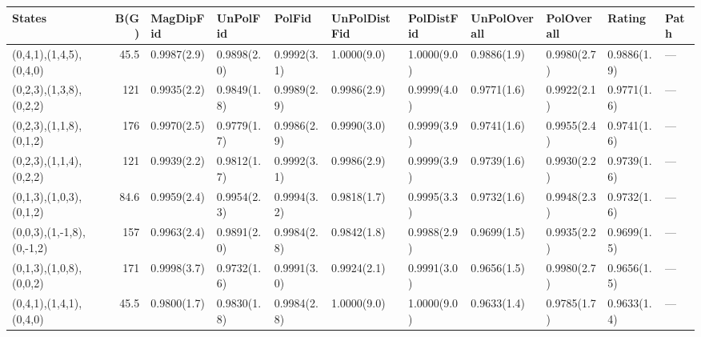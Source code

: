 \begin{tabular}{lrlllllllll}
\hline
 States                    &   B(G) & MagDipFid   & UnPolFid    & PolFid      & UnPolDistFid   & PolDistFid   & UnPolOverall   & PolOverall   & Rating      & Path   \\
\hline
 (0,4,1),(1,4,5),(0,4,0)   &   45.5 & 0.9987(2.9) & 0.9898(2.0) & 0.9992(3.1) & 1.0000(9.0)    & 1.0000(9.0)  & 0.9886(1.9)    & 0.9980(2.7)  & 0.9886(1.9) & ---    \\
 (0,2,3),(1,3,8),(0,2,2)   &  121   & 0.9935(2.2) & 0.9849(1.8) & 0.9989(2.9) & 0.9986(2.9)    & 0.9999(4.0)  & 0.9771(1.6)    & 0.9922(2.1)  & 0.9771(1.6) & ---    \\
 (0,2,3),(1,1,8),(0,1,2)   &  176   & 0.9970(2.5) & 0.9779(1.7) & 0.9986(2.9) & 0.9990(3.0)    & 0.9999(3.9)  & 0.9741(1.6)    & 0.9955(2.4)  & 0.9741(1.6) & ---    \\
 (0,2,3),(1,1,4),(0,2,2)   &  121   & 0.9939(2.2) & 0.9812(1.7) & 0.9992(3.1) & 0.9986(2.9)    & 0.9999(3.9)  & 0.9739(1.6)    & 0.9930(2.2)  & 0.9739(1.6) & ---    \\
 (0,1,3),(1,0,3),(0,1,2)   &   84.6 & 0.9959(2.4) & 0.9954(2.3) & 0.9994(3.2) & 0.9818(1.7)    & 0.9995(3.3)  & 0.9732(1.6)    & 0.9948(2.3)  & 0.9732(1.6) & ---    \\
 (0,0,3),(1,-1,8),(0,-1,2) &  157   & 0.9963(2.4) & 0.9891(2.0) & 0.9984(2.8) & 0.9842(1.8)    & 0.9988(2.9)  & 0.9699(1.5)    & 0.9935(2.2)  & 0.9699(1.5) & ---    \\
 (0,1,3),(1,0,8),(0,0,2)   &  171   & 0.9998(3.7) & 0.9732(1.6) & 0.9991(3.0) & 0.9924(2.1)    & 0.9991(3.0)  & 0.9656(1.5)    & 0.9980(2.7)  & 0.9656(1.5) & ---    \\
 (0,4,1),(1,4,1),(0,4,0)   &   45.5 & 0.9800(1.7) & 0.9830(1.8) & 0.9984(2.8) & 1.0000(9.0)    & 1.0000(9.0)  & 0.9633(1.4)    & 0.9785(1.7)  & 0.9633(1.4) & ---    \\
\hline
\end{tabular}